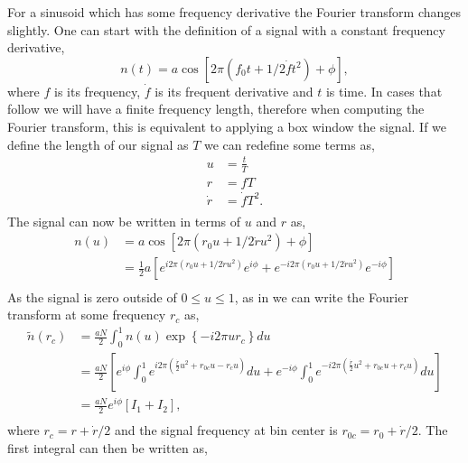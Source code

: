 For a sinusoid which has some frequency derivative the Fourier transform changes slightly. 
One can start with the definition of a signal with a constant frequency derivative, 
\begin{equation}
n(t) = a \cos{\left[2\pi (f_0 t + 1/2 \dot{f} t^2) + \phi \right]},
\end{equation}
where $f$ is its frequency, $\dot{f}$ is its frequent derivative and $t$ is time.
In cases that follow we will have a finite frequency length, therefore when computing the Fourier transform, this is equivalent to applying a box window the signal.
If we define the length of our signal as $T$ we can redefine some terms as,
\begin{equation}
\begin{split}
u &= \frac{t}{T} \\
r &= f T \\
\dot{r} &= \dot{f} T^2 .\\
\end{split}
\end{equation}
The signal can now be written in terms of $u$ and $r$ as,
\begin{equation}
\begin{split}
n(u) &= a \cos{\left[2\pi (r_0 u + 1/2 \dot{r} u^2) + \phi\right]} \\
&= \frac{1}{2} a \left[ e^{i 2\pi(r_0 u + 1/2 \dot{r} u^2)}e^{i\phi}  + e^{-i 2\pi(r_0 u + 1/2 \dot{r} u^2)}e^{-i\phi}    \right] \\
\end{split}
\end{equation}
As the signal is zero outside of $0 \leq u \leq	 1$, as in \citep{ransom2002FourierTechniques} we can write the Fourier transform at some frequency $r_c$ as,
\begin{equation}
\begin{split}
\tilde{n}(r_c) &= \frac{aN}{2}  \int_{0}^{1} n(u) \exp{\left\{ -i 2 \pi u r_c\right\}} du \\
&= \frac{aN}{2} \left[ e^{i\phi} \int_{0}^{1} e^{i 2 \pi(\frac{\dot{r}}{2} u^2 + r_{0c}u - r_cu)} du  +  e^{-i\phi}\int_{0}^{1} e^{-i 2 \pi(\frac{\dot{r}}{2} u^2 + r_{0c}u + r_cu)} du\right] \\
&= \frac{aN}{2} e^{i\phi} \left[  I_1 + I_2   \right], \\
\end{split}
\end{equation}
where $r_c = r + \dot{r}/2$ and the signal frequency at bin center is $r_{0c} = r_0 + \dot{r}/2$.
The first integral can then be written as,
